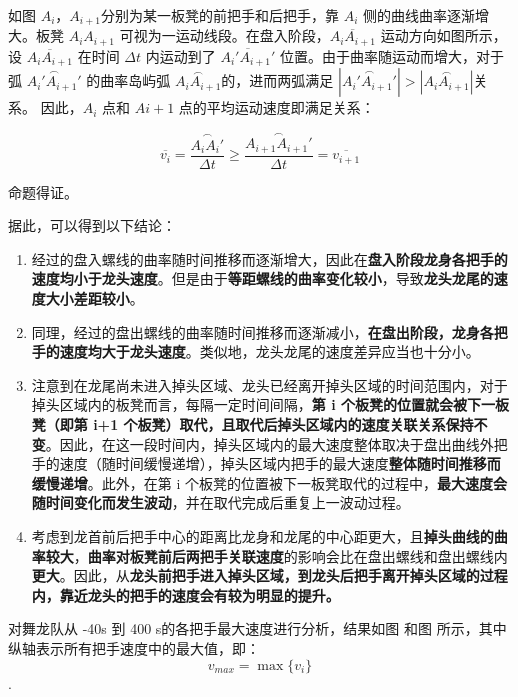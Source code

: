 \documentclass[a4paper]{article}
\begin{document}
		如图%
		$A_i$，$A_{i+1}$分别为某一板凳的前把手和后把手，靠 $A_i$ 侧的曲线曲率逐渐增大。板凳 $A_iA_{i+1}$ 可视为一运动线段。在盘入阶段，$\overline{A_iA_{i+1}}$ 运动方向如图所示，设 $\overline{A_iA_{i+1}}$ 在时间 $\Delta t$ 内运动到了 $\overline{A_i'A_{i+1}'}$ 位置。由于曲率随运动而增大，对于弧 $\overset{\frown}{A_i'A_{i+1}'}$ 的曲率岛屿弧 $ \overset{\frown}{A_iA_{i+1}} $的，进而两弧满足 $|\overset{\frown}{A_i'A_{i+1}'}| > |\overset{\frown}{A_iA_{i+1}}| $关系。 因此，$A_i$ 点和 $A{i+1}$ 点的平均运动速度即满足关系：
		
		\begin{equation}
			\overline{v_{i}} = \dfrac{\overset{\frown}{A_iA_i'}}{\Delta t} \ge
			\frac{\overset{\frown}{A_{i+1}A_{i+1}'}}{\Delta t} = \overline{v_{i+1}}
		\end{equation}
		
		命题得证。
		
		据此，可以得到以下结论：
		\begin{enumerate}
			\item 经过的盘入螺线的曲率随时间推移而逐渐增大，因此在\textbf{盘入阶段龙身各把手的速度均小于龙头速度}。但是由于\textbf{等距螺线的曲率变化较小}，导致\textbf{龙头龙尾的速度大小差距较小}。
			
			\item 同理，经过的盘出螺线的曲率随时间推移而逐渐减小，\textbf{在盘出阶段，龙身各把手的速度均大于龙头速度}。类似地，龙头龙尾的速度差异应当也十分小。
			
			\item 注意到在龙尾尚未进入掉头区域、龙头已经离开掉头区域的时间范围内，对于掉头区域内的板凳而言，每隔一定时间间隔，\textbf{第 i 个板凳的位置就会被下一板凳（即第 i+1 个板凳）取代，且取代后掉头区域内的速度关联关系保持不变}。因此，在这一段时间内，掉头区域内的最大速度整体取决于盘出曲线外把手的速度（随时间缓慢递增），掉头区域内把手的最大速度\textbf{整体随时间推移而缓慢递增}。此外，在第 i 个板凳的位置被下一板凳取代的过程中，\textbf{最大速度会随时间变化而发生波动}，并在取代完成后重复上一波动过程。
			
			\item 考虑到龙首前后把手中心的距离比龙身和龙尾的中心距更大，且\textbf{掉头曲线的曲率较大}，\textbf{曲率对板凳前后两把手关联速度}的影响会比在盘出螺线和盘出螺线内\textbf{更大}。因此，从\textbf{龙头前把手进入掉头区域，到龙头后把手离开掉头区域的过程内，靠近龙头的把手的速度会有较为明显的提升。}
		\end{enumerate}
		
		对舞龙队从 -40s 到 400 s的各把手最大速度进行分析，结果如图 %
		和图%
		所示，其中纵轴表示所有把手速度中的最大值，即：
		$$v_{max} = \max\{{v_i}\}$$.
		
\end{document}
